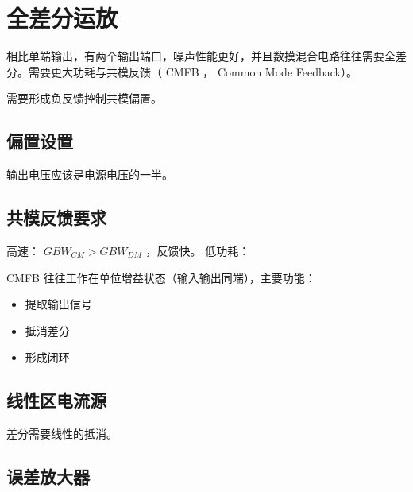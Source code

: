 \documentclass[cn,11pt,chinese,black,simple]{../elegantbook}
\begin{document}
\fi 
\def\chapname{07ad}

\chapter{全差分运放}

相比单端输出，有两个输出端口，噪声性能更好，并且数摸混合电路往往需要全差分。需要更大功耗与共模反馈（ CMFB ， Common Mode Feedback）。

需要形成负反馈控制共模偏置。

\section{偏置设置}

输出电压应该是电源电压的一半。

\section{共模反馈要求}

高速： \(GBW_{CM} > GBW_{DM}\) ，反馈快。
低功耗： 

CMFB 往往工作在单位增益状态（输入输出同端），主要功能：

\begin{itemize}
    \item 提取输出信号
    \item 抵消差分
    \item 形成闭环
\end{itemize}

\section{线性区电流源}

差分需要线性的抵消。

\section{误差放大器}



\let\chapname\undefined
\ifx\mainclass\undefined
\end{document}

